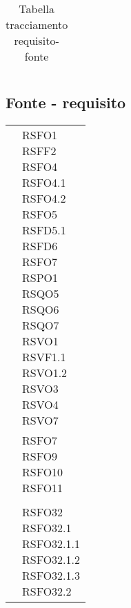 {{{{{\begin{center}
\begin{longtable}{|p{7.5cm}|p{7.5cm}|}
		\caption[Tabella tracciamento requisito-fonte]{Tabella tracciamento requisito-fonte}\label{4.5}\\
	\end{longtable}
\end{center}
\clearpage

\subsection{Fonte - requisito}\label{RequisitiTracciamentoDeiRequisitiFonteRequisito}
\def\tabularxcolumn#1{m{#1}}
{
	\begin{center}
		\renewcommand{\arraystretch}{1.4}
		\begin{longtable}{|p{7.5cm}|p{7.5cm}|}
		\hline
		\rowcolor{airforceblue}
		\makecell[c]{\textbf{Fonte}} & \makecell[c]{\textbf{Codice RS}}  \\
		\hline
		\makecell[c]{Capitolato$_{\scaleto{G}{3pt}}$} & \makecell[c]{RSFO1\\RSFF2\\RSFO4\\RSFO4.1\\RSFO4.2\\RSFO5\\RSFD5.1\\RSFD6\\RSFO7\\RSPO1\\RSQO5\\RSQO6\\RSQO7\\RSVO1\\RSVF1.1\\RSVO1.2\\RSVO3\\RSVO4\\RSVO7} \\
		\hline
		\makecell[c]{UC1} & \makecell[c]{RSFO7 \\ RSFO9 \\ RSFO10 \\ RSFO11} \\
		\hline
		\makecell[c]{UC2} & \makecell[c]{RSFO3} \\
		\hline
		\makecell[c]{UC3} & \makecell[c]{RSFO32\\RSFO32.1\\RSFO32.1.1\\RSFO32.1.2\\RSFO32.1.3\\RSFO32.2} \\

\end{longtable}
\end{center}}}}}}}
